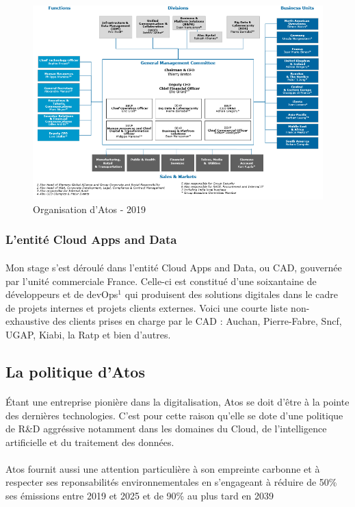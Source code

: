 \documentclass[12pt]{article}
\begin{document}
\begin {sloppypar}
\begin{figure}[h]
  \includegraphics[width=\textwidth] {orga_atos.png}
  \caption {Organisation d'Atos - 2019 }
\end{figure}

\subsubsection{L'entité Cloud Apps and Data}
\paragraph{}
Mon stage s'est déroulé dans l'entité Cloud Apps and Data, ou CAD, gouvernée par 
l'unité commerciale France. Celle-ci est constitué d'une soixantaine de développeurs et de devOps$^{1}$ qui produisent 
des solutions digitales dans le cadre de projets internes et projets clients externes.
Voici une courte liste non-exhaustive des clients prises en charge par le CAD : Auchan, Pierre-Fabre, Sncf, UGAP, Kiabi,
 la Ratp et bien d'autres.

\subsection{La politique d'Atos}
\paragraph{}
Étant une entreprise pionière dans la digitalisation, Atos se doit d'être à la pointe
des dernières technologies. C'est pour cette raison qu'elle se dote d'une politique 
de R\&D aggréssive notamment dans les domaines du Cloud, de l'intelligence artificielle 
et du traitement des données.
\paragraph{}
Atos fournit aussi une attention particulière à son empreinte carbonne et à respecter ses reponsabilités environnementales
en s'engageant à réduire de 50\% ses émissions entre 2019 et 2025 et de 90\% au plus tard en 2039 
\newpage

\end{sloppypar}
\end{document}
